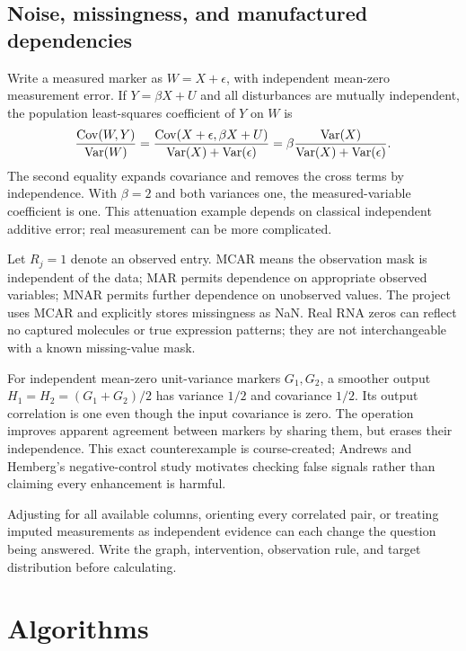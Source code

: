\documentclass[11pt,oneside]{scrbook}
\begin{document}
\section{Noise, missingness, and manufactured dependencies}
Write a measured marker as $W=X+\epsilon$, with independent mean-zero measurement
error. If $Y=\beta X+U$ and all disturbances are mutually independent, the population
least-squares coefficient of $Y$ on $W$ is
\[
\frac{\operatorname{Cov}(W,Y)}{\operatorname{Var}(W)}
=\frac{\operatorname{Cov}(X+\epsilon,\beta X+U)}{\operatorname{Var}(X)+\operatorname{Var}(\epsilon)}
=\beta\frac{\operatorname{Var}(X)}{\operatorname{Var}(X)+\operatorname{Var}(\epsilon)}.
\]
The second equality expands covariance and removes the cross terms by independence.
With $\beta=2$ and both variances one, the measured-variable coefficient is one.
This attenuation example depends on classical independent additive error; real measurement
can be more complicated.

Let $R_j=1$ denote an observed entry. MCAR means the observation mask is independent of
the data; MAR permits dependence on appropriate observed variables; MNAR permits further
dependence on unobserved values. The project uses MCAR and explicitly stores missingness
as NaN. Real RNA zeros can reflect no captured molecules or true expression patterns;
they are not interchangeable with a known missing-value mask.

For independent mean-zero unit-variance markers $G_1,G_2$, a smoother output
$H_1=H_2=(G_1+G_2)/2$ has variance $1/2$ and covariance $1/2$. Its output correlation
is one even though the input covariance is zero. The operation improves apparent agreement
between markers by sharing them, but erases their independence. This exact counterexample
is course-created; Andrews and Hemberg's negative-control study motivates checking
false signals rather than claiming every enhancement is harmful.

\begin{pitfall}
Adjusting for all available columns, orienting every correlated pair, or treating imputed
measurements as independent evidence can each change the question being answered.
Write the graph, intervention, observation rule, and target distribution before calculating.
\end{pitfall}

\chapter{Algorithms}
\end{document}
